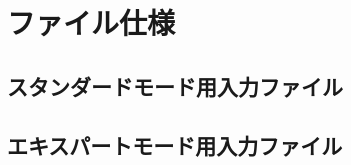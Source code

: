 \chapter{ファイル仕様}

\section{スタンダードモード用入力ファイル}
\label{Ch:HowToStandard}


\newpage
\section{エキスパートモード用入力ファイル}
\label{Ch:HowToExpert}

